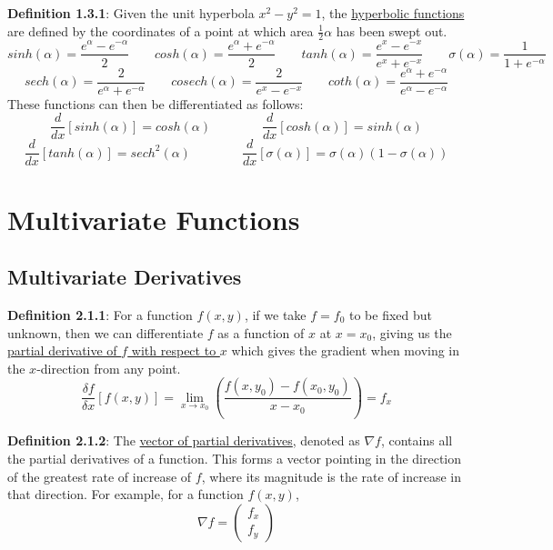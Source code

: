 \documentclass{article}
\newcommand{\separate}[1] {\vspace{#1 pt}\noindent}
\newcommand{\definition}[2]{\textbf{Definition #1}: #2\label{def:#1}}
\begin{document}
\definition{1.3.1}{Given the unit hyperbola \(x^2-y^2=1\), the \underline{hyperbolic functions} are defined by the coordinates of a point at which area \(\frac{1}{2}\alpha\) has been swept out.}
\begin{equation*}
    sinh(\alpha) = \frac{e^\alpha - e^{-\alpha}}{2} \qquad cosh(\alpha) = \frac{e^\alpha + e^{-\alpha}}{2} \qquad tanh(\alpha) = \frac{e^x - e^{-x}}{e^x + e^{-x}} \qquad \sigma(\alpha) = \frac{1}{1 + e^{-\alpha}}
\end{equation*}
\begin{equation*}
    sech(\alpha) = \frac{2}{e^\alpha + e^{-\alpha}} \qquad cosech(\alpha) = \frac{2}{e^x - e^{-x}} \qquad coth(\alpha) = \frac{e^\alpha + e^{-\alpha}}{e^\alpha - e^{-\alpha}}
\end{equation*}
These functions can then be differentiated as follows:
\begin{equation*}
    \frac{d}{dx}\left[sinh(\alpha)\right] = cosh(\alpha) \qquad\qquad \frac{d}{dx}\left[cosh(\alpha)\right] = sinh(\alpha)
\end{equation*}
\begin{equation*}
    \frac{d}{dx}\left[tanh(\alpha)\right] = sech^2(\alpha) \qquad\qquad \frac{d}{dx}\left[\sigma(\alpha)\right] = \sigma(\alpha)(1-\sigma(\alpha))
\end{equation*}

\section{Multivariate Functions}

\subsection{Multivariate Derivatives}

\definition{2.1.1}{For a function \(f(x,y)\), if we take \(f=f_0\) to be fixed but unknown, then we can differentiate \(f\) as a function of \(x\) at \(x=x_0\), giving us the \underline{partial derivative of \(f\) with respect to \(x\)} which gives the gradient when moving in the \(x\)-direction from any point.}
\begin{equation}
    \frac{\delta f}{\delta x} \left[f(x,y)\right] = \lim_{x \rightarrow x_0} \left(\frac{f(x,y_0)-f(x_0,y_0)}{x-x_0}\right) = f_x
\end{equation}

\separate{7}\definition{2.1.2}{The \underline{vector of partial derivatives}, denoted as \(\nabla f\), contains all the partial derivatives of a function. This forms a vector pointing in the direction of the greatest rate of increase of \(f\), where its magnitude is the rate of increase in that direction. For example, for a function \(f(x,y)\), 
\begin{equation} 
    \nabla f = \begin{pmatrix}f_x\\f_y\end{pmatrix}
\end{equation}}
\end{document}
